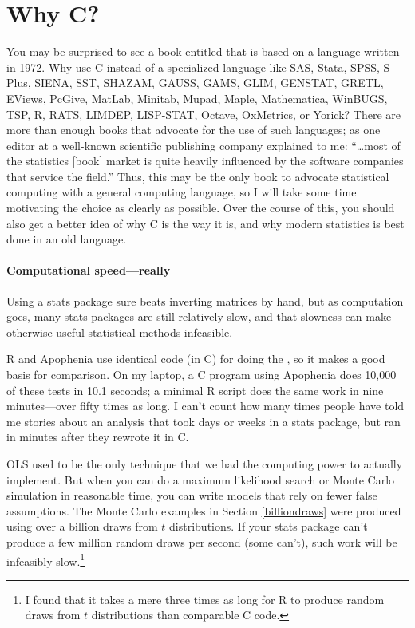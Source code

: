 \section{Why C?}
You may be surprised to see a book entitled  that is based on a language written in 1972. 
Why use C instead of a specialized language like SAS, Stata, SPSS,
S-Plus, SIENA, SST, SHAZAM, GAUSS, GAMS, GLIM, GENSTAT, GRETL, EViews,
PcGive, MatLab, Minitab, Mupad, Maple, Mathematica, WinBUGS, TSP, R,
RATS, LIMDEP, LISP-STAT, Octave, OxMetrics, or Yorick?  There are more
than enough books that advocate for the use of such languages; as one
editor at a well-known scientific publishing company explained to me:
``\dots most of the statistics [book] market is quite heavily influenced
by the software companies that service the field.''  Thus, this may be
the only book to advocate statistical computing with a general computing
language, so I will take some time motivating the choice as clearly as
possible. Over the course of this, you should also get a better idea of
why C is the way it is, and why modern statistics is best done in an old
language.

\paragraph{Computational speed---really} Using a stats package sure
beats inverting matrices by hand, but as computation goes, many stats
packages are still relatively slow, and that slowness can make otherwise
useful statistical methods infeasible.

R and Apophenia use identical code (in C) for doing the , so it makes a good basis for comparison.  On my laptop,
a C program using Apophenia does 10,000 of these tests in 10.1 seconds;
a minimal R script does the same work in nine minutes---over fifty
times as long. I can't count how many times people have told me stories
about an analysis that took days or weeks in a stats package, but ran
in minutes after they rewrote it in C.

OLS used to be the only technique that we had the computing power to
actually implement. But when you can do a maximum likelihood search
or Monte Carlo simulation in reasonable time, you can write models
that rely on fewer false assumptions. The Monte Carlo examples in Section
\ref{billiondraws} were produced using over a billion draws from $t$
distributions. If your stats package can't produce a few million random
draws per second (some can't), such work will be infeasibly
slow.\footnote{I found that it takes a mere three
times as long for R to produce random draws from $t$ distributions
than comparable C code.}

